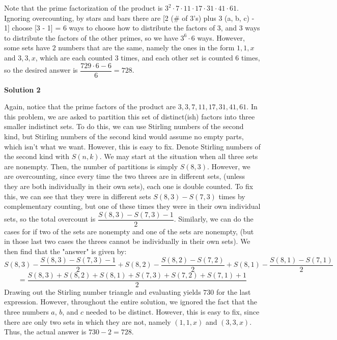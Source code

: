 \begin{enumerate}
Note that the prime factorization of the product is $3^{2}\cdot 7 \cdot 11 \cdot 17 \cdot 31 \cdot 41 \cdot 61$. Ignoring overcounting, by stars and bars there are [2 (\# of 3's) plus 3 (a, b, c)  - 1] choose [3 - 1] = $6$ ways to choose how to distribute the factors of $3$, and $3$ ways to distribute the factors of the other primes, so we have $3^{6} \cdot 6$ ways. However, some sets have $2$ numbers that are the same, namely the ones in the form $1,1,x$ and $3,3,x$, which are each counted $3$ times, and each other set is counted $6$ times, so the desired answer is $\dfrac{729 \cdot 6-6}{6} = \boxed{728}$.

 



\textbf{Solution 2}

Again, notice that the prime factors of the product are $3, 3, 7, 11, 17, 31, 41, 61$. In this problem, we are asked to partition this set of distinct(ish) factors into three smaller indistinct sets. To do this, we can use Stirling numbers of the second kind, but Stirling numbers of the second kind would assume no empty parts, which isn't what we want. However, this is easy to fix. Denote Stirling numbers of the second kind with $S(n,k)$. We may start at the situation when all three sets are nonempty. Then, the number of partitions is simply $S(8,3)$. However, we are overcounting, since every time the two threes are in different sets, (unless they are both individually in their own sets), each one is double counted. To fix this, we can see that they were in different sets $S(8, 3) - S(7,3)$ times by complementary counting, but one of these times they were in their own individual sets, so the total overcount is $\dfrac{S(8,3) - S(7,3) - 1}{2}$. Similarly, we can do the cases for if two of the sets are nonempty and one of the sets are nonempty, (but in those last two cases the threes cannot be individually in their own sets). We then find that the "answer" is given by:
 \[S(8,3) - \dfrac{S(8,3) - S(7,3) - 1}{2} + S(8,2) - \dfrac{S(8,2) - S(7,2)}{2}+ S(8,1) - \dfrac{S(8,1) - S(7,1)}{2}\]
 \[= \dfrac{S(8,3)+S(8,2) + S(8,1) + S(7,3) + S(7,2) + S(7,1) + 1}{2}\]Drawing out the Stirling number triangle and evaluating yields $730$ for the last expression. However, throughout the entire solution, we ignored the fact that the three numbers $a$, $b$, and $c$ needed to be distinct. However, this is easy to fix, since there are only two sets in which they are not, namely $(1,1,x)$ and $(3,3,x)$. Thus, the actual answer is $730 - 2 = \boxed{728}$.


\end{enumerate}
